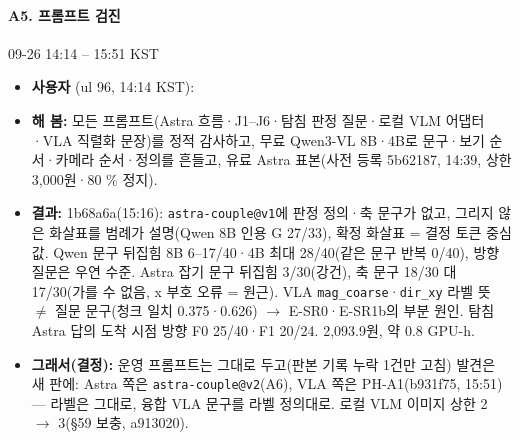 \paragraph{A5. 프롬프트 검진}
{\small 09-26 14:14 -- 15:51 KST}
\begin{itemize}
  \item \textbf{사용자} (ul 96, 14:14 KST): 
  \item \textbf{해 봄:} 모든 프롬프트(Astra 흐름·J1--J6·탐침 판정 질문·로컬 VLM 어댑터·VLA 직렬화 문장)를 정적 감사하고, 무료 Qwen3-VL 8B·4B로 문구·보기 순서·카메라 순서·정의를 흔들고, 유료 Astra 표본(사전 등록 5b62187, 14:39, 상한 3,000원·80 \% 정지).
  \item \textbf{결과:} 1b68a6a(15:16): \texttt{astra-\allowbreak{}couple@v1}에 판정 정의·축 문구가 없고, 그리지 않은 화살표를 범례가 설명(Qwen 8B 인용 G 27/33), 확정 화살표 = 결정 토큰 중심값. Qwen 문구 뒤집힘 8B 6--17/40·4B 최대 28/40(같은 문구 반복 0/40), 방향 질문은 우연 수준. Astra 잡기 문구 뒤집힘 3/30(강건), 축 문구 18/30 대 17/30(가를 수 없음, x 부호 오류 = 원근). VLA \texttt{mag\_\allowbreak{}coarse}·\texttt{dir\_\allowbreak{}xy} 라벨 뜻 $\neq$ 질문 문구(청크 일치 0.375·0.626) $\rightarrow$ E-SR0·E-SR1b의 부분 원인. 탐침 Astra 답의 도착 시점 방향 F0 25/40·F1 20/24. 2,093.9원, 약 0.8 GPU-h.
  \item \textbf{그래서(결정):} 운영 프롬프트는 그대로 두고(판본 기록 누락 1건만 고침) 발견은 새 판에: Astra 쪽은 \texttt{astra-\allowbreak{}couple@v2}(A6), VLA 쪽은 PH-A1(b931f75, 15:51) --- 라벨은 그대로, 융합 VLA 문구를 라벨 정의대로. 로컬 VLM 이미지 상한 2 $\rightarrow$ 3(§59 보충, a913020).
\end{itemize}

